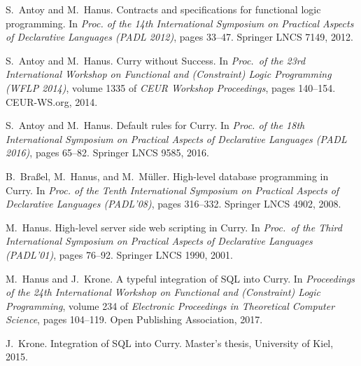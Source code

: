 \documentclass[11pt,fleqn]{article}
\begin{document}
\sloppy


\clearpage
\appendix


\begin{thebibliography}{10}

S.~Antoy and M.~Hanus.
\newblock Contracts and specifications for functional logic programming.
\newblock In {\em Proc. of the 14th International Symposium on Practical
  Aspects of Declarative Languages (PADL 2012)}, pages 33--47. Springer LNCS
  7149, 2012.

S.~Antoy and M.~Hanus.
\newblock Curry without {Success}.
\newblock In {\em Proc.\ of the 23rd International Workshop on Functional and
  (Constraint) Logic Programming (WFLP 2014)}, volume 1335 of {\em {CEUR}
  Workshop Proceedings}, pages 140--154. CEUR-WS.org, 2014.

S.~Antoy and M.~Hanus.
\newblock Default rules for {Curry}.
\newblock In {\em Proc. of the 18th International Symposium on Practical
  Aspects of Declarative Languages (PADL 2016)}, pages 65--82. Springer LNCS
  9585, 2016.

B.~Bra{\ss}el, M.~Hanus, and M.~M{\"u}ller.
\newblock High-level database programming in {Curry}.
\newblock In {\em Proc. of the Tenth International Symposium on Practical
  Aspects of Declarative Languages (PADL'08)}, pages 316--332. Springer LNCS
  4902, 2008.

M.~Hanus.
\newblock High-level server side web scripting in {C}urry.
\newblock In {\em Proc.\ of the Third International Symposium on Practical
  Aspects of Declarative Languages (PADL'01)}, pages 76--92. Springer LNCS
  1990, 2001.

M.~Hanus and J.~Krone.
\newblock A typeful integration of {SQL} into {Curry}.
\newblock In {\em Proceedings of the 24th International Workshop on Functional
  and (Constraint) Logic Programming}, volume 234 of {\em Electronic
  Proceedings in Theoretical Computer Science}, pages 104--119. Open Publishing
  Association, 2017.

J.~Krone.
\newblock Integration of {SQL} into {Curry}.
\newblock Master's thesis, University of Kiel, 2015.

\end{thebibliography}
\end{document}
